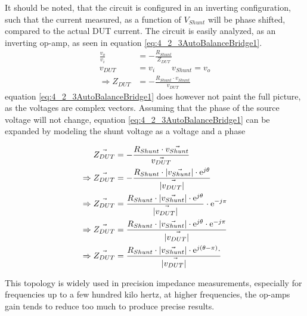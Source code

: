 It should be noted, that the circuit is configured in an inverting configuration, such that the current measured, as a function of $V_{Shunt}$ will be  phase shifted, compared to the actual DUT current. The circuit is easily analyzed, as an inverting op-amp, as seen in equation \ref{eq:4_2_3AutoBalanceBridge1}.
\begin{equation}
    \label{eq:4_2_3AutoBalanceBridge1}
    \begin{split}
        \frac{v_o}{v_i} &= -\frac{R_{Shunt}}{Z_{DUT}}\\
        v_{DUT} &= v_i \qquad v_{Shunt} = v_o \\
        \Rightarrow Z_{DUT} &= -\frac{R_{Shunt}\cdot v_{Shunt}}{v_{DUT}}
    \end{split}
\end{equation}
equation \ref{eq:4_2_3AutoBalanceBridge1} does however not paint the full picture, as the voltages are complex vectors. Assuming that the phase of the source voltage will not change, equation \ref{eq:4_2_3AutoBalanceBridge1} can be expanded by modeling 
the shunt voltage as a voltage and a phase

\begin{equation}
    \label{eq:4_2_3AutoBalanceBridge2}
    \begin{split}
        \vec{Z_{DUT}} &= -\frac{R_{Shunt}\cdot \vec{v_{Shunt}}}{\vec{v_{DUT}}} \\
        \Rightarrow \vec{Z_{DUT}} &= -\frac{R_{Shunt}\cdot |\vec{v_{Shunt}}|\cdot\mathrm{e} ^{j\theta}}{|\vec{v_{DUT}|}} \\
        \Rightarrow \vec{Z_{DUT}} &= \frac{R_{Shunt}\cdot |\vec{v_{Shunt}}|\cdot\mathrm{e} ^{j\theta}}{|\vec{v_{DUT}|}} \cdot \mathrm{e} ^{-j\pi} \\
        \Rightarrow \vec{Z_{DUT}} &= \frac{R_{Shunt}\cdot |\vec{v_{Shunt}}|\cdot\mathrm{e} ^{j\theta}\cdot \mathrm{e} ^{-j\pi}}{|\vec{v_{DUT}|}}  \\
        \Rightarrow \vec{Z_{DUT}} &= \frac{R_{Shunt}\cdot |\vec{v_{Shunt}}|\cdot\mathrm{e} ^{j(\theta-\pi)}\cdot}{|\vec{v_{DUT}|}}
    \end{split}
\end{equation}

This topology is widely used in precision impedance measurements, especially for frequencies up to a few hundred kilo hertz, at higher frequencies, the op-amps gain tends to reduce too much to produce precise results.